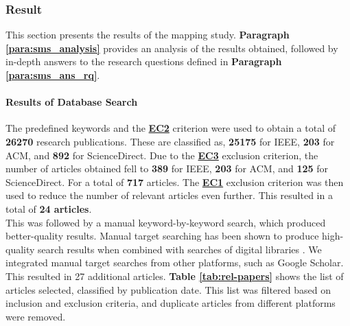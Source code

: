     
        \subsubsection{Result}
        This section presents the results of the mapping study. \textbf{Paragraph \ref{para:sms_analysis}} provides an analysis of the results obtained, followed by in-depth answers to the research questions defined in \textbf{Paragraph \ref{para:sms_ans_rq}}.

            \paragraph{Results of Database Search}
            The predefined keywords and the \hyperref[EC2]{\textbf{EC2}} criterion were used to obtain a total of \textbf{26270} research publications. These are classified as, \textbf{25175} for IEEE, \textbf{203} for ACM, and \textbf{892} for ScienceDirect. Due to the \hyperref[EC3]{\textbf{EC3}} exclusion criterion, the number of articles obtained fell to \textbf{389} for IEEE, \textbf{203} for ACM, and \textbf{125} for ScienceDirect. For a total of \textbf{717} articles. The \hyperref[EC1]{\textbf{EC1}} exclusion criterion was then used to reduce the number of relevant articles even further. This resulted in a total of \textbf{24 articles}.\\
            This was followed by a manual keyword-by-keyword search, which produced better-quality results. Manual target searching has been shown to produce high-quality search results when combined with searches of digital libraries \cite{petersen2008systematic}. We integrated manual target searches from other platforms, such as Google Scholar. This resulted in 27 additional articles. \textbf{Table \ref{tab:rel-papers}} shows the list of articles selected, classified by publication date. This list was filtered based on inclusion and exclusion criteria, and duplicate articles from different platforms were removed.\\

